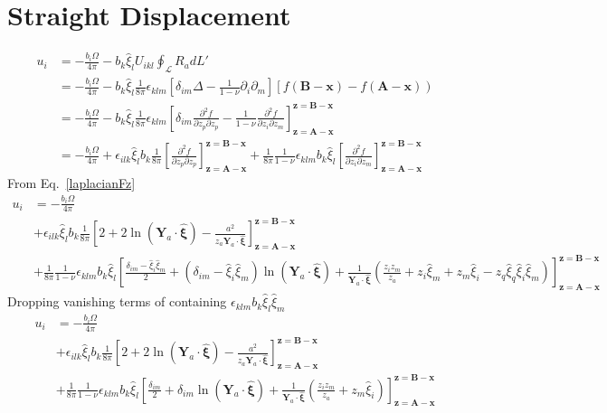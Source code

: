 \section{Straight Displacement}
\begin{align}
 u_i
 &=-\frac{ b_i\Omega}{4\pi}-b_k\hat{\xi}_lU_{ikl}\oint_\mathcal{L}R_adL'\nonumber\\
 &=-\frac{ b_i\Omega}{4\pi}-b_k\hat{\xi}_l\frac{1}{8\pi}\epsilon_{klm}\left[ \delta_{im}\Delta  -\frac{1}{1-\nu} \partial_i\partial_m  \right]\left[f(\bm B-\bm x)-f(\bm A-\bm x)\right)\nonumber\\
 &=-\frac{ b_i\Omega}{4\pi}-b_k\hat{\xi}_l\frac{1}{8\pi}\epsilon_{klm}\left[ \delta_{im}\frac{\partial^2f}{\partial z_p\partial z_p}  -\frac{1}{1-\nu} \frac{\partial^2 f}{\partial z_i\partial z_m}  \right]^{\bm z=\bm B-\bm x}_{\bm z=\bm A-\bm x}\nonumber\\
 &=-\frac{ b_i\Omega}{4\pi}+\epsilon_{ilk}\hat{\xi}_lb_k\frac{1}{8\pi}\left[ \frac{\partial^2f}{\partial z_p\partial z_p}\right]^{\bm z=\bm B-\bm x}_{\bm z=\bm A-\bm x}  +\frac{1}{8\pi}\frac{1}{1-\nu} \epsilon_{klm}b_k\hat{\xi}_l\left[\frac{\partial^2 f}{\partial z_i\partial z_m}  \right]^{\bm z=\bm B-\bm x}_{\bm z=\bm A-\bm x}
\end{align}
From Eq.~\eqref{laplacianFz}
\begin{align}
 u_i &=-\frac{ b_i\Omega}{4\pi}\nonumber\\
 &+\epsilon_{ilk}\hat{\xi}_lb_k\frac{1}{8\pi}\left[2+ 2\ln\left(\bm Y_a \cdot \hat{\bm \xi}\right)-\frac{a^2}{z_a \bm Y_a \cdot \hat{\bm \xi}}\right]^{\bm z=\bm B-\bm x}_{\bm z=\bm A-\bm x}  \nonumber\\
 &+\frac{1}{8\pi}\frac{1}{1-\nu} \epsilon_{klm}b_k\hat{\xi}_l\left[\frac{ \delta_{im}-\hat{\xi}_i\hat{\xi}_m}{2}
+ (\delta_{im}-\hat{\xi}_i\hat{\xi}_m)\ln\left(\bm Y_a \cdot \hat{\bm \xi}\right)
+ \frac{1}{ \bm Y_a \cdot \hat{\bm \xi}}\left(\frac{z_iz_m}{z_a}+z_i\hat{\xi}_m+z_m\hat{\xi}_i-z_q\hat{\xi}_q\hat{\xi}_i\hat{\xi}_m\right) \right]^{\bm z=\bm B-\bm x}_{\bm z=\bm A-\bm x}
\end{align}
Dropping vanishing terms of containing $\epsilon_{klm}b_k\hat{\xi}_l\hat{\xi}_m$
\begin{align}
 u_i &=-\frac{ b_i\Omega}{4\pi}\nonumber\\
 &+\epsilon_{ilk}\hat{\xi}_lb_k\frac{1}{8\pi}\left[2+ 2\ln\left(\bm Y_a \cdot \hat{\bm \xi}\right)-\frac{a^2}{z_a \bm Y_a \cdot \hat{\bm \xi}}\right]^{\bm z=\bm B-\bm x}_{\bm z=\bm A-\bm x}  \nonumber\\
 &+\frac{1}{8\pi}\frac{1}{1-\nu} \epsilon_{klm}b_k\hat{\xi}_l\left[\frac{ \delta_{im}}{2}
+ \delta_{im}\ln\left(\bm Y_a \cdot \hat{\bm \xi}\right)
+ \frac{1}{ \bm Y_a \cdot \hat{\bm \xi}}\left(\frac{z_iz_m}{z_a}+z_m\hat{\xi}_i\right) \right]^{\bm z=\bm B-\bm x}_{\bm z=\bm A-\bm x}
\end{align}
